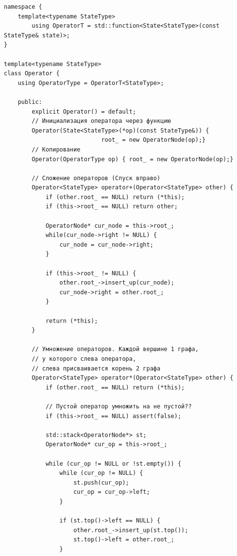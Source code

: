 \documentclass[12pt,fleqn]{article}
\begin{document}
\begin{mdframed}[linecolor=black, topline=true, bottomline=true,
    leftline=false, rightline=false]
\begin{verbatim}
namespace {
    template<typename StateType>
        using OperatorT = std::function<State<StateType>(const StateType& state)>;
}

template<typename StateType>
class Operator {
    using OperatorType = OperatorT<StateType>;

    public:
        explicit Operator() = default;
        // Инициализация оператора через функцию
        Operator(State<StateType>(*op)(const StateType&)) { 
                            root_ = new OperatorNode(op);}
        // Копирование
        Operator(OperatorType op) { root_ = new OperatorNode(op);}

        // Сложение операторов (Спуск вправо)
        Operator<StateType> operator+(Operator<StateType> other) {
            if (other.root_ == NULL) return (*this);
            if (this->root_ == NULL) return other;

            OperatorNode* cur_node = this->root_;
            while(cur_node->right != NULL) {
                cur_node = cur_node->right;
            }

            if (this->root_ != NULL) {
                other.root_->insert_up(cur_node);
                cur_node->right = other.root_;
            }

            return (*this);
        }

        // Умножение операторов. Каждой вершине 1 графа,
        // у которого слева оператора,
        // слева присваивается корень 2 графа
        Operator<StateType> operator*(Operator<StateType> other) {
            if (other.root_ == NULL) return (*this);

            // Пустой оператор умножить на не пустой??
            if (this->root_ == NULL) assert(false); 

            std::stack<OperatorNode*> st;
            OperatorNode* cur_op = this->root_;

            while (cur_op != NULL or !st.empty()) {
                while (cur_op != NULL) {
                    st.push(cur_op);
                    cur_op = cur_op->left;
                }

                if (st.top()->left == NULL) {
                    other.root_->insert_up(st.top());
                    st.top()->left = other.root_;
                }


\end{verbatim}
\end{mdframed}
\end{document}
